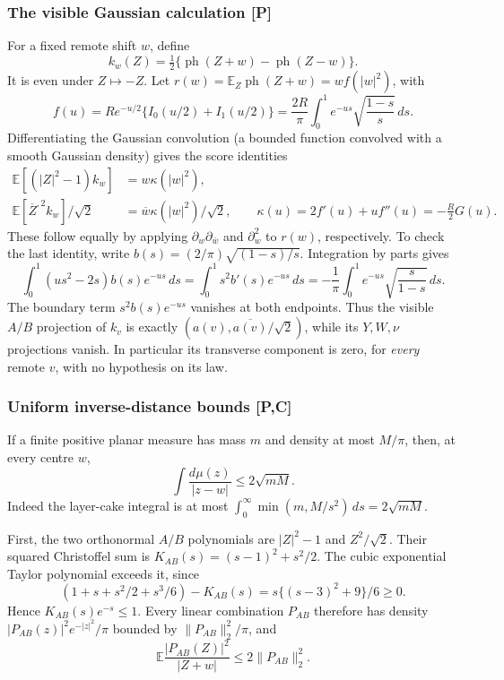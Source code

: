 \subsubsection{The visible Gaussian calculation [P]}
For a fixed remote shift $w$, define
\[
 k_w(Z)=\tfrac12\{\operatorname{ph}(Z+w)-\operatorname{ph}(Z-w)\}.
\]
It is even under $Z\mapsto-Z$. Let
$r(w)=\mathbb E_Z\operatorname{ph}(Z+w)=wf(|w|^2)$, with
\[
 f(u)=R e^{-u/2}\{I_0(u/2)+I_1(u/2)\}
 =\frac{2R}{\pi}\int_0^1e^{-us}\sqrt{\frac{1-s}{s}}\,ds.
\]
Differentiating the Gaussian convolution (a bounded function convolved
with a smooth Gaussian density) gives the score identities
\begin{align*}
 \mathbb E[(|Z|^2-1)k_w]&=w\kappa(|w|^2),\\
 \mathbb E[\overline Z^{,2}k_w]/\sqrt2
      &=\overline w\kappa(|w|^2)/\sqrt2,
 \qquad \kappa(u)=2f'(u)+uf''(u)=-\frac R2G(u).
\end{align*}
These follow equally by applying $\partial_w\partial_{\bar w}$ and
$\partial_w^2$ to $r(w)$, respectively. To check the last identity,
write $b(s)=(2/\pi)\sqrt{(1-s)/s}$. Integration by parts gives
\[
 \int_0^1(us^2-2s)b(s)e^{-us}\,ds
 =\int_0^1s^2b'(s)e^{-us}\,ds
 =-\frac1\pi\int_0^1e^{-us}\sqrt{\frac{s}{1-s}}\,ds.
\]
The boundary term $s^2b(s)e^{-us}$ vanishes at both endpoints.
Thus the visible $A/B$ projection of $k_v$ is exactly
$(a(v),\overline{a(v)}/\sqrt2)$, while its $Y,W,\nu$ projections vanish.
In particular its transverse component is zero, for \emph{every}
remote $v$, with no hypothesis on its law.

\subsubsection{Uniform inverse-distance bounds [P,C]}
If a finite positive planar measure has mass $m$ and density at most
$M/\pi$, then, at every centre $w$,
\begin{equation}\label{eq:sector-density-bound}
 \int\frac{d\mu(z)}{|z-w|}\le2\sqrt{mM}.
\end{equation}
Indeed the layer-cake integral is at most
$\int_0^\infty\min(m,M/s^2)\,ds=2\sqrt{mM}$.

First, the two orthonormal $A/B$ polynomials are
$|Z|^2-1$ and $Z^2/\sqrt2$. Their squared Christoffel sum is
$K_{AB}(s)=(s-1)^2+s^2/2$.
The cubic exponential Taylor polynomial exceeds it, since
\[
 (1+s+s^2/2+s^3/6)-K_{AB}(s)
       =s\{(s-3)^2+9\}/6\ge0.
\]
Hence $K_{AB}(s)e^{-s}\le1$. Every linear combination $P_{AB}$
therefore has density $|P_{AB}(z)|^2e^{-|z|^2}/\pi$ bounded by
$\|P_{AB}\|_2^2/\pi$, and
\[
 \mathbb E\frac{|P_{AB}(Z)|^2}{|Z+w|}\le2\|P_{AB}\|_2^2.
\]

